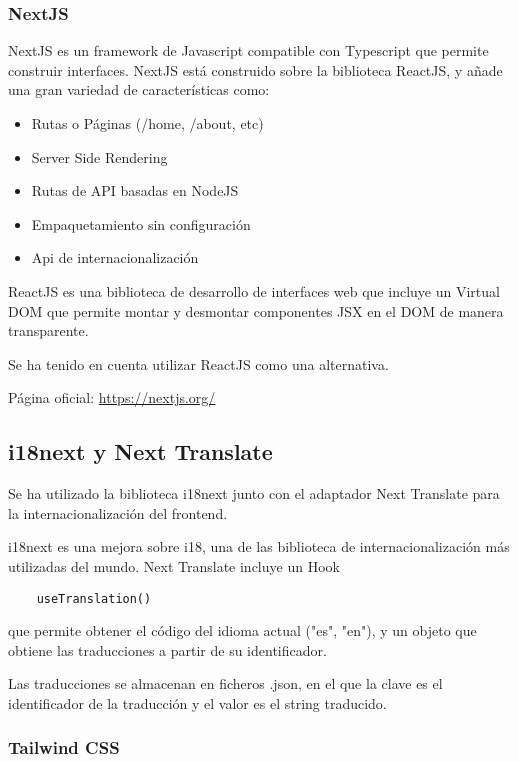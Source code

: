 \hypertarget{nextjs}{%
\subsubsection{NextJS}\label{nextjs-front}}

NextJS es un framework de Javascript compatible con Typescript que
permite construir interfaces. NextJS está construido sobre la biblioteca
ReactJS, y añade una gran variedad de características como:

\begin{itemize}
\itemsep0em 
\item
  Rutas o Páginas (/home, /about, etc)
\item
  Server Side Rendering
\item
  Rutas de API basadas en NodeJS
\item
  Empaquetamiento sin configuración
\item
  Api de internacionalización
\end{itemize}

ReactJS es una biblioteca de desarrollo de interfaces web que incluye un
Virtual DOM que permite montar y desmontar componentes JSX en el DOM de
manera transparente.

Se ha tenido en cuenta utilizar ReactJS como una alternativa.

Página oficial: \href{https://nextjs.org/}{https://nextjs.org/}

\subsection{i18next y Next Translate}\label{i18n}
Se ha utilizado la biblioteca i18next junto con el adaptador Next Translate para la internacionalización del frontend. 

i18next es una mejora sobre i18, una de las biblioteca de internacionalización más utilizadas del mundo. Next Translate incluye un Hook \begin{verbatim}
    useTranslation()
\end{verbatim} que permite obtener el código del idioma actual ("es", "en"), y un objeto que obtiene las traducciones a partir de su identificador. 

Las traducciones se almacenan en ficheros .json, en el que la clave es el identificador de la traducción y el valor es el string traducido. 



\hypertarget{tailwind-css}{%
\subsubsection{\texorpdfstring{Tailwind CSS
}{Tailwind CSS }}\label{tailwind-css}}

